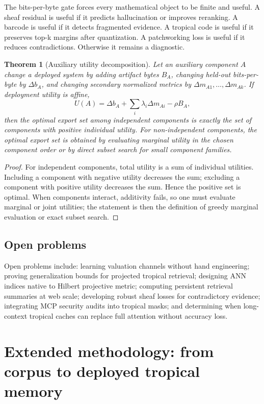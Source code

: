 \documentclass[11pt]{article}
\newtheorem{theorem}{Theorem}[section]
\theoremstyle{definition}
\theoremstyle{remark}
\begin{document}
The bits-per-byte gate forces every mathematical object to be finite and useful. A sheaf residual is useful if it predicts hallucination or improves reranking. A barcode is useful if it detects fragmented evidence. A tropical code is useful if it preserves top-k margins after quantization. A patchworking loss is useful if it reduces contradictions. Otherwise it remains a diagnostic.

\begin{theorem}[Auxiliary utility decomposition]
Let an auxiliary component \(A\) change a deployed system by adding artifact bytes \(B_A\), changing held-out bits-per-byte by \(\Delta b_A\), and changing secondary normalized metrics by \(\Delta m_{A1},\ldots,\Delta m_{Ak}\). If deployment utility is affine,
\[
    U(A)=\Delta b_A+\sum_i\lambda_i\Delta m_{Ai}-\rho B_A,
\]
then the optimal export set among independent components is exactly the set of components with positive individual utility. For non-independent components, the optimal export set is obtained by evaluating marginal utility in the chosen component order or by direct subset search for small component families.
\end{theorem}
\begin{proof}
For independent components, total utility is a sum of individual utilities. Including a component with negative utility decreases the sum; excluding a component with positive utility decreases the sum. Hence the positive set is optimal. When components interact, additivity fails, so one must evaluate marginal or joint utilities; the statement is then the definition of greedy marginal evaluation or exact subset search.
\end{proof}

\subsection{Open problems}

Open problems include: learning valuation channels without hand engineering; proving generalization bounds for projected tropical retrieval; designing ANN indices native to Hilbert projective metric; computing persistent retrieval summaries at web scale; developing robust sheaf losses for contradictory evidence; integrating MCP security audits into tropical masks; and determining when long-context tropical caches can replace full attention without accuracy loss.


\section{Extended methodology: from corpus to deployed tropical memory}
\end{document}
